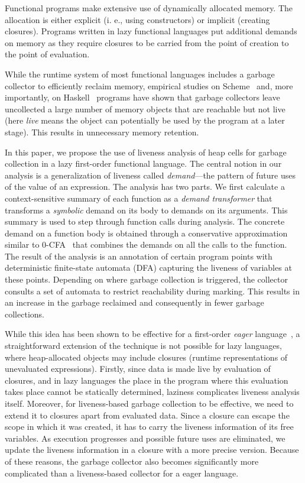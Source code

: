 \documentclass[preprint, 9pt]{sigplanconf}
\begin{document}
Functional programs make extensive use of dynamically allocated
memory.  The
allocation  is either  explicit (i. e., using  constructors) or
implicit (creating  closures).  Programs  written in  lazy
functional languages put additional  demands on memory as they require
closures to  be carried  from the  point of creation  to the  point of
evaluation.

While  the runtime  system  of most  functional  languages includes  a
garbage collector to efficiently  reclaim memory, empirical studies on
Scheme~\cite{karkare06effectiveness}   and,   more   importantly,   on
Haskell~\cite{rojemo96lag} programs have shown that garbage collectors
leave uncollected a large number  of memory objects that are reachable
but not live (here {\em live} means the object can potentially be used
by the program at a  later stage).  This results in unnecessary memory
retention.

In this paper,  we propose the use of liveness  analysis of heap cells
for garbage collection in a lazy first-order functional language.  The
central notion in our analysis  is a generalization of liveness called
{\em  demand}---the  pattern  of  future  uses  of  the  value  of  an
expression.   The  analysis  has  two parts.   We  first  calculate  a
context-sensitive  summary   of  each   function  as  a   {\em  demand
  transformer} that transforms a {\em  symbolic} demand on its body to
demands  on its  arguments.   This  summary is  used  to step  through
function calls  during analysis.   The concrete  demand on  a function
body  is  obtained through  a  conservative  approximation similar  to
0-CFA~\cite{Shivers:1988} that  combines the demands on  all the calls
to  the function.   The result  of the  analysis is  an annotation  of
certain program points with  deterministic finite-state automata (DFA)
capturing the  liveness of  variables at  these points.   Depending on
where garbage collection is triggered, the collector consults a set of
automata to restrict reachability during  marking.  This results in an
increase in  the garbage reclaimed  and consequently in  fewer garbage
collections.

While this idea has been shown  to be effective for a first-order {\em
  eager}  language~\cite{asati14lgc}, a  straightforward extension  of
the technique is not possible for lazy languages, where heap-allocated
objects may  include closures (runtime representations  of unevaluated
expressions).   Firstly, since  data  is made  live  by evaluation  of
closures, and  in lazy languages the  place in the program  where this
evaluation  takes  place  cannot be  statically  determined,  laziness
complicates  liveness analysis  itself.  Moreover,  for liveness-based
garbage collection to  be effective, we need to extend  it to closures
apart from  evaluated data.  Since a  closure can escape the  scope in
which it was created, it has  to carry the liveness information of its
free variables. As execution progresses and possible future
uses are eliminated,  we update the liveness information  in a closure
with a  more precise version.  Because of these reasons,   the garbage
collector  also   becomes  significantly   more  complicated   than  a
liveness-based collector for a eager language.
\end{document}
